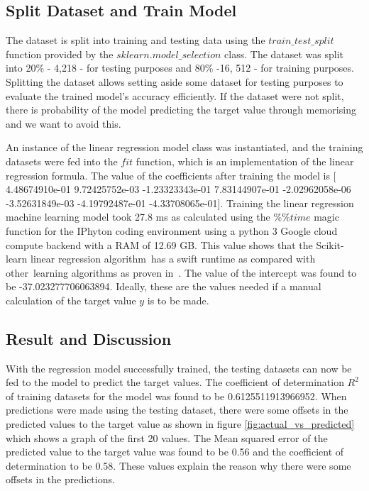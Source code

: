 \documentclass[conference]{IEEEtran}
\begin{document}
\subsection{Split Dataset and Train Model}
The dataset is split into training and testing data using the $train\_test\_split$ function provided by the $sklearn.model\_selection$ class. The dataset was split into 20\% - 4,218 - for testing purposes and 80\% -16, 512 - for training purposes. Splitting the dataset allows setting aside some dataset for testing purposes to evaluate the trained model's accuracy efficiently. If the dataset were not split, there is probability of the model predicting the target value through memorising and we want to avoid this. 

An instance of the linear regression model class was instantiated, and the training datasets were fed into the $fit$ function, which is an implementation of the linear regression formula. The value of the coefficients after training the model is [ 4.48674910e-01 9.72425752e-03 -1.23323343e-01 7.83144907e-01
 -2.02962058e-06 -3.52631849e-03 -4.19792487e-01 -4.33708065e-01]. Training the linear regression machine learning model took 27.8 ms as calculated using the $\%\%time$ magic function for the IPhyton coding environment using a python 3 Google cloud compute backend with a RAM of 12.69 GB. This value shows that the Scikit-learn linear regression algorithm has a swift runtime as compared with other learning algorithms as proven in \cite{massaron2016regression}. The value of the intercept was found to be -37.023277706063894. Ideally, these are the values needed if a manual calculation of the target value $y$ is to be made. 

\subsection{Result and Discussion}
With the regression model successfully trained, the testing datasets can now be fed to the model to predict the target values. The coefficient of determination $R^2$ of training datasets for the model was found to be 0.6125511913966952.
When predictions were made using the testing dataset, there were some offsets in the predicted values to the target value as shown in figure \ref{fig:actual_vs_predicted} which shows a graph of the first 20 values. The Mean squared error of the predicted value to the target value was found to be 0.56 and the coefficient of determination to be 0.58. These values explain the reason why there were some offsets in the predictions.
\end{document}
